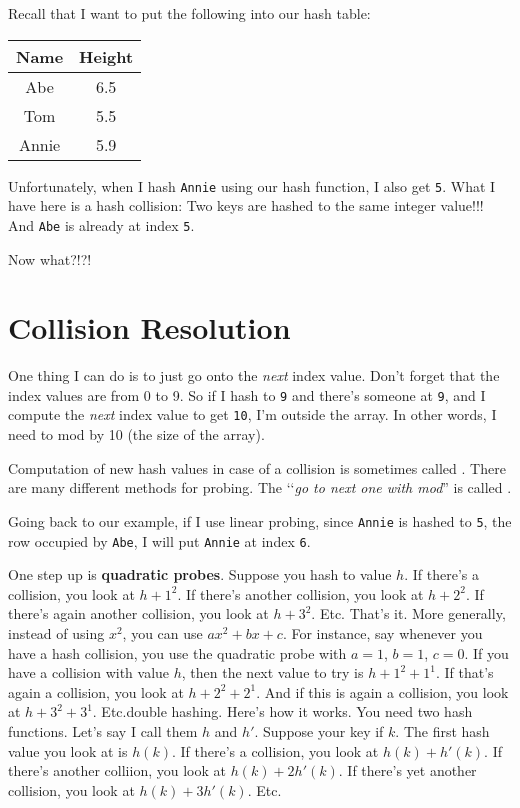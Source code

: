Recall that I want to put the following into our hash table:
\begin{longtable}{|c|c|}
\hline
Name & Height \\
\hline
Abe &  6.5 \\
Tom &  5.5 \\
Annie &  5.9 \\
\hline
\end{longtable}
Unfortunately, when I hash \verb!Annie! using our
hash function, I also get \verb!5!.
What I have here is a hash collision:
Two keys are hashed to the same integer value!!!
And \verb!Abe! is already at index \verb!5!. 

Now what?!?!




\newpage
\section{Collision Resolution}

One thing I can do is to just go onto the \textit{next} index value.
Don't forget that the index values are from 0 to 9.
So if I hash to \verb!9! and there's someone at \verb!9!,
and I compute the \textit{next} index value to get \verb!10!,
I'm outside the array.
In other words, I need to mod by 10 (the size of the array).

Computation of new hash values in case of a collision is
sometimes called .
There are many different methods for probing.
The \lq\lq \textit{go to next one with mod}''
is called .

Going back to our example, if I use linear probing, since
\verb!Annie! is hashed to \verb!5!, the row occupied by \verb!Abe!,
I will put \verb!Annie! at index \verb!6!.



One step up is \textbf{quadratic probes}.
Suppose you hash to value $h$.
If there's a collision, you look at $h + 1^2$.
If there's another collision, you look at $h + 2^2$.
If there's again another collision, you look at $h + 3^2$.
Etc.
That's it.
More generally, instead of using $x^2$, you can 
use $ax^2 + bx + c$.
For instance, say whenever you have a hash collision,
you use
the quadratic probe with $a = 1$, $b = 1$, $c = 0$.
If you have a collision with value $h$, then
the next value to try is 
$h + 1^2 + 1^1$.
If that's again a collision, you look at 
$h + 2^2 + 2^1$.
And if this is again a collision, you look at
$h + 3^2 + 3^1$.
Etc.{double hashing}.
Here's how it works.
You need two hash functions.
Let's say I call them $h$ and $h'$.
Suppose your key if $k$.
The first hash value you look at is $h(k)$.
If there's a collision, you look at 
$h(k) + h'(k)$.
If there's another colliion, you look at
$h(k) + 2h'(k)$.
If there's yet another collision, you look at
$h(k) + 3h'(k)$.
Etc.

